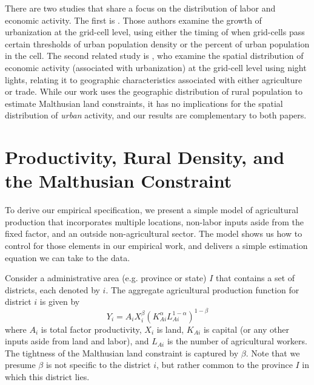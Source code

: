 \documentclass[11pt]{article}
\begin{document}
There are two studies that share a focus on the distribution of labor and economic activity. The first is \citet{mfm2014}. Those authors examine the growth of urbanization at the grid-cell level, using either the timing of when grid-cells pass certain thresholds of urban population density or the percent of urban population in the cell. The second related study is \citet{hssw2016}, who examine the spatial distribution of economic activity (associated with urbanization) at the grid-cell level using night lights, relating it to geographic characteristics associated with either agriculture or trade. While our work uses the geographic distribution of rural population to estimate Malthusian land constraints, it has no implications for the spatial distribution of \textit{urban} activity, and our results are complementary to both papers.

\section{Productivity, Rural Density, and the Malthusian Constraint}\label{SEC_agmodel}
To derive our empirical specification, we present a simple model of agricultural production that incorporates multiple locations, non-labor inputs aside from the fixed factor, and an outside non-agricultural sector. The model shows us how to control for those elements in our empirical work, and delivers a simple estimation equation we can take to the data. 

Consider a administrative area (e.g. province or state) $I$ that contains a set of districts, each denoted by $i$. The aggregate agricultural production function for district $i$ is given by 
\begin{equation}
Y_{i} = A_{i} X_{i}^{\beta} \left(K_{Ai}^{\alpha}L_{Ai}^{1-\alpha}\right)^{1-\beta} \label{EQ_production}
\end{equation}
where $A_{i}$ is total factor productivity, $X_{i}$ is land, $K_{Ai}$ is capital (or any other inputs aside from land and labor), and $L_{Ai}$ is the number of agricultural workers. The tightness of the Malthusian land constraint is captured by $\beta$. Note that we presume $\beta$ is not specific to the district $i$, but rather common to the province $I$ in which this district lies.
\end{document}
